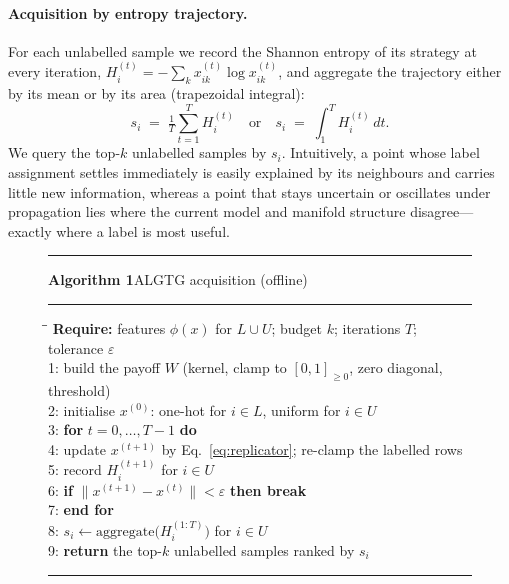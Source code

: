 \documentclass[11pt]{article}
\begin{document}
\paragraph{Acquisition by entropy trajectory.} For each unlabelled sample we record
the Shannon entropy of its strategy at every iteration,
$H_i^{(t)} = -\sum_{k} x_{ik}^{(t)} \log x_{ik}^{(t)}$, and aggregate the trajectory
either by its mean or by its area (trapezoidal integral):
\begin{equation}
  s_i \;=\; \tfrac{1}{T}\!\sum_{t=1}^{T} H_i^{(t)}
  \quad\text{or}\quad
  s_i \;=\; \textstyle\int_{1}^{T} H_i^{(t)}\,dt .
\end{equation}
We query the top-$k$ unlabelled samples by $s_i$. Intuitively, a point whose label
assignment settles immediately is easily explained by its neighbours and carries
little new information, whereas a point that stays uncertain or oscillates under
propagation lies where the current model and manifold structure disagree---exactly
where a label is most useful.

\begin{figure}[t]
\hrule\vspace{3pt}
\noindent\textbf{Algorithm 1}\quad ALGTG acquisition (offline)
\vspace{3pt}\hrule\vspace{5pt}
\begin{tabbing}
\hspace{1.6em}\=\hspace{1.4em}\=\kill
\textbf{Require:} features $\phi(x)$ for $L\cup U$; budget $k$; iterations $T$; tolerance $\varepsilon$ \\[2pt]
1: \> build the payoff $W$ (kernel, clamp to $[0,1]_{\ge0}$, zero diagonal, threshold) \\
2: \> initialise $x^{(0)}$: one-hot for $i\in L$, uniform for $i\in U$ \\
3: \> \textbf{for} $t=0,\dots,T-1$ \textbf{do} \\
4: \> \> update $x^{(t+1)}$ by Eq.~\eqref{eq:replicator}; re-clamp the labelled rows \\
5: \> \> record $H_i^{(t+1)}$ for $i\in U$ \\
6: \> \> \textbf{if} $\lVert x^{(t+1)}-x^{(t)}\rVert<\varepsilon$ \textbf{then break} \\
7: \> \textbf{end for} \\
8: \> $s_i \leftarrow \mathrm{aggregate}\big(H_i^{(1:T)}\big)$ for $i\in U$ \\
9: \> \textbf{return} the top-$k$ unlabelled samples ranked by $s_i$
\end{tabbing}
\vspace{-4pt}\hrule
\label{alg:algtg}
\end{figure}
\end{document}
